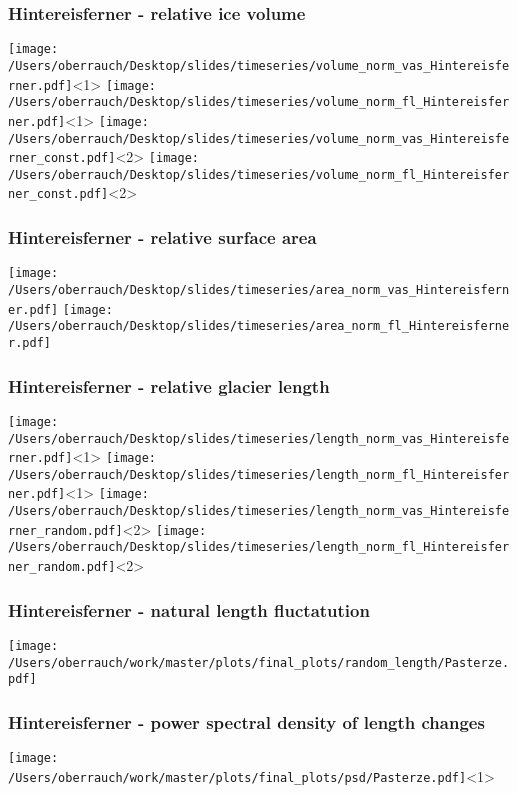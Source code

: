 \documentclass[12pt, aspectratio=169, abstract=off, oneside]{beamer}
\begin{document}
    \begin{frame}[t]\frametitle{Hintereisferner - relative ice volume}
        \centering
        \vfill
        \texttt{[image: /Users/oberrauch/Desktop/slides/timeseries/volume\_norm\_vas\_Hintereisferner.pdf]}<1>%
        \texttt{[image: /Users/oberrauch/Desktop/slides/timeseries/volume\_norm\_fl\_Hintereisferner.pdf]}<1>%
        \texttt{[image: /Users/oberrauch/Desktop/slides/timeseries/volume\_norm\_vas\_Hintereisferner\_const.pdf]}<2>%
        \texttt{[image: /Users/oberrauch/Desktop/slides/timeseries/volume\_norm\_fl\_Hintereisferner\_const.pdf]}<2>%
    \end{frame}
        
    \begin{frame}[t]\frametitle{Hintereisferner - relative surface area}
        \centering
        \vfill
        \texttt{[image: /Users/oberrauch/Desktop/slides/timeseries/area\_norm\_vas\_Hintereisferner.pdf]}
        \texttt{[image: /Users/oberrauch/Desktop/slides/timeseries/area\_norm\_fl\_Hintereisferner.pdf]}
    \end{frame}
        
    \begin{frame}[t]\frametitle{Hintereisferner - relative glacier length}
        \centering
        \vfill
        \texttt{[image: /Users/oberrauch/Desktop/slides/timeseries/length\_norm\_vas\_Hintereisferner.pdf]}<1>%
        \texttt{[image: /Users/oberrauch/Desktop/slides/timeseries/length\_norm\_fl\_Hintereisferner.pdf]}<1>%
        \texttt{[image: /Users/oberrauch/Desktop/slides/timeseries/length\_norm\_vas\_Hintereisferner\_random.pdf]}<2>%
        \texttt{[image: /Users/oberrauch/Desktop/slides/timeseries/length\_norm\_fl\_Hintereisferner\_random.pdf]}<2>%
    
    \end{frame}

    \begin{frame}[t]\frametitle{Hintereisferner - natural length fluctatution}
        \centering
        \vfill
        \texttt{[image: /Users/oberrauch/work/master/plots/final\_plots/random\_length/Pasterze.pdf]}
    
    \end{frame}
    
    \begin{frame}[t]\frametitle{Hintereisferner - power spectral density of length changes}
        \centering
        \vfill
        \texttt{[image: /Users/oberrauch/work/master/plots/final\_plots/psd/Pasterze.pdf]}<1>
    
    \end{frame}
\end{document}
